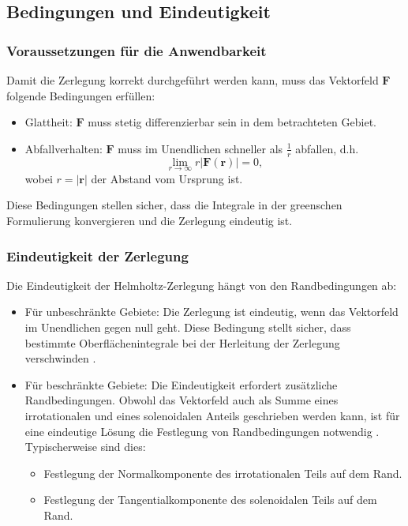 \subsection{Bedingungen und Eindeutigkeit
\label{helmholtz:subsection:Bedingungen_Eindeutigkeit}}

\subsubsection{Voraussetzungen für die Anwendbarkeit}
Damit die Zerlegung korrekt durchgeführt werden kann, muss das Vektorfeld $\boldsymbol{F}$ folgende Bedingungen erfüllen:

\begin{itemize}
\item Glattheit: $\boldsymbol{F}$ muss stetig differenzierbar sein in dem betrachteten Gebiet.
\item Abfallverhalten: $\boldsymbol{F}$ muss im Unendlichen schneller als $\frac{1}{r}$ abfallen, d.h.
\begin{equation}
\lim_{r \to \infty} r|\boldsymbol{F}(\boldsymbol{r})| = 0,
\end{equation}
wobei $r = |\boldsymbol{r}|$ der Abstand vom Ursprung ist.
\end{itemize}
Diese Bedingungen stellen sicher, dass die Integrale in der greenschen
Formulierung konvergieren und die Zerlegung eindeutig ist.

\subsubsection{Eindeutigkeit der Zerlegung
\label{helmholtz:subsection:Bedingungen_onlyEindeutigkeit}}

Die Eindeutigkeit der Helmholtz-Zerlegung hängt von den Randbedingungen ab:

\begin{itemize}
\item Für unbeschränkte Gebiete: Die Zerlegung ist eindeutig, wenn
das Vektorfeld im Unendlichen gegen null geht.
Diese Bedingung stellt sicher, dass bestimmte Oberflächenintegrale
bei der Herleitung der Zerlegung verschwinden \cite{wiki:helmholtz}.

\item Für beschränkte Gebiete: Die Eindeutigkeit erfordert zusätzliche Randbedingungen.
Obwohl das Vektorfeld auch als Summe eines irrotationalen und eines
solenoidalen Anteils geschrieben werden kann, ist für eine eindeutige
Lösung die Festlegung von Randbedingungen notwendig \cite{wiki:helmholtz}.
Typischerweise sind dies:
  \begin{itemize}
    \item Festlegung der Normalkomponente des irrotationalen Teils auf dem Rand.
    \item Festlegung der Tangentialkomponente des solenoidalen Teils auf dem Rand.
  \end{itemize}
\end{itemize}

